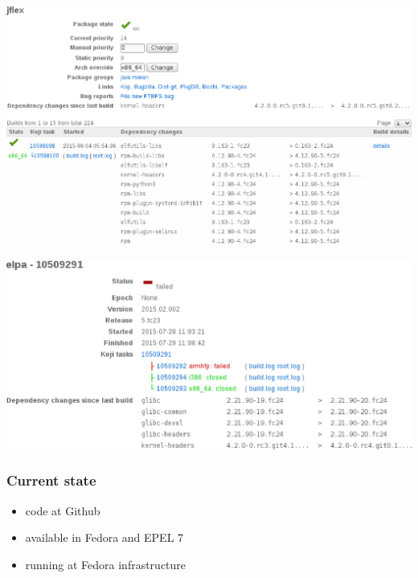 \documentclass[pdftex,unicode,xcolor=table]{beamer}
\begin{document}
\begin{frame}[fragile]
  \begin{center}
    \includegraphics[scale=0.48]{koschei-frontend-2.eps}
  \end{center}
\end{frame}

\begin{frame}[fragile]
  \begin{center}
    \includegraphics[scale=0.48]{koschei-frontend-3.eps}
  \end{center}
\end{frame}

\begin{frame}
  \frametitle{Current state}
  \begin{itemize}
    \item code at Github
    \item available in Fedora and EPEL 7
    \item running at Fedora infrastructure
  \end{itemize}
\end{frame}
\end{document}
